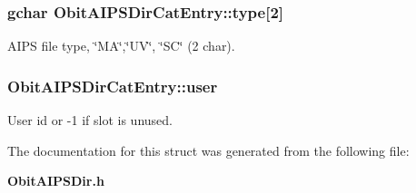 \subsubsection{\setlength{\rightskip}{0pt plus 5cm}gchar {\bf Obit\-AIPSDir\-Cat\-Entry::type}[2]}\label{structObitAIPSDirCatEntry_o6}


AIPS file type, \char`\"{}MA\char`\"{},\char`\"{}UV\char`\"{}, \char`\"{}SC\char`\"{} (2 char). 

\subsubsection{ {\bf Obit\-AIPSDir\-Cat\-Entry::user}}\label{structObitAIPSDirCatEntry_o0}


User id or -1 if slot is unused. 



The documentation for this struct was generated from the following file:\begin{CompactItemize}
\item 
{\bf Obit\-AIPSDir.h}\end{CompactItemize}
